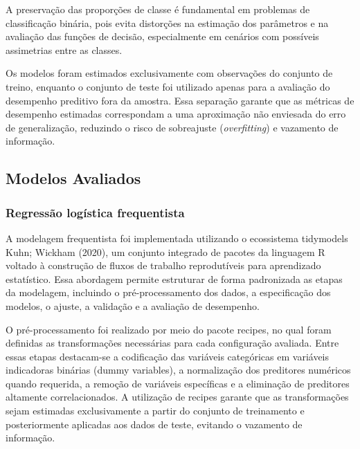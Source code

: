 \documentclass[
  brazilian,
  12pt,
  letterpaper,
  DIV=11,
  numbers=noendperiod]{scrartcl}
\begin{document}
A preservação das proporções de classe é fundamental em problemas de
classificação binária, pois evita distorções na estimação dos parâmetros
e na avaliação das funções de decisão, especialmente em cenários com
possíveis assimetrias entre as classes.

Os modelos foram estimados exclusivamente com observações do conjunto de
treino, enquanto o conjunto de teste foi utilizado apenas para a
avaliação do desempenho preditivo fora da amostra. Essa separação
garante que as métricas de desempenho estimadas correspondam a uma
aproximação não enviesada do erro de generalização, reduzindo o risco de
sobreajuste (\emph{overfitting}) e vazamento de informação.

\subsection{Modelos Avaliados}\label{modelos-avaliados}

\subsubsection{Regressão logística
frequentista}\label{regressuxe3o-loguxedstica-frequentista-1}

A modelagem frequentista foi implementada utilizando o ecossistema
tidymodels Kuhn; Wickham (2020), um conjunto integrado de pacotes da
linguagem R voltado à construção de fluxos de trabalho reprodutíveis
para aprendizado estatístico. Essa abordagem permite estruturar de forma
padronizada as etapas da modelagem, incluindo o pré-processamento dos
dados, a especificação dos modelos, o ajuste, a validação e a avaliação
de desempenho.

O pré-processamento foi realizado por meio do pacote recipes, no qual
foram definidas as transformações necessárias para cada configuração
avaliada. Entre essas etapas destacam-se a codificação das variáveis
categóricas em variáveis indicadoras binárias (dummy variables), a
normalização dos preditores numéricos quando requerida, a remoção de
variáveis específicas e a eliminação de preditores altamente
correlacionados. A utilização de recipes garante que as transformações
sejam estimadas exclusivamente a partir do conjunto de treinamento e
posteriormente aplicadas aos dados de teste, evitando o vazamento de
informação.
\end{document}
